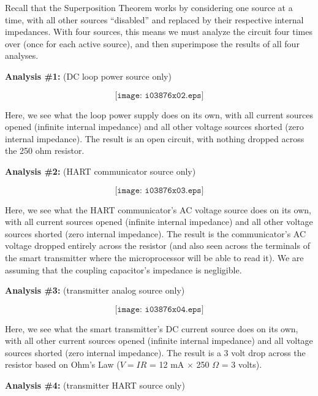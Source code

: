 
Recall that the Superposition Theorem works by considering one source at a time, with all other sources ``disabled'' and replaced by their respective internal impedances.  With four sources, this means we must analyze the circuit four times over (once for each active source), and then superimpose the results of all four analyses.







\noindent
{\bf Analysis \#1:} (DC loop power source only)

$$\texttt{[image: i03876x02.eps]}$$

Here, we see what the loop power supply does on its own, with all current sources opened (infinite internal impedance) and all other voltage sources shorted (zero internal impedance).  The result is an open circuit, with nothing dropped across the 250 ohm resistor.

\filbreak

\noindent
{\bf Analysis \#2:} (HART communicator source only)

$$\texttt{[image: i03876x03.eps]}$$

Here, we see what the HART communicator's AC voltage source does on its own, with all current sources opened (infinite internal impedance) and all other voltage sources shorted (zero internal impedance).  The result is the communicator's AC voltage dropped entirely across the resistor (and also seen across the terminals of the smart transmitter where the microprocessor will be able to read it).  We are assuming that the coupling capacitor's impedance is negligible.

\filbreak

\noindent
{\bf Analysis \#3:} (transmitter analog source only)

$$\texttt{[image: i03876x04.eps]}$$

Here, we see what the smart transmitter's DC current source does on its own, with all other current sources opened (infinite internal impedance) and all voltage sources shorted (zero internal impedance).  The result is a 3 volt drop across the resistor based on Ohm's Law ($V = IR$ = 12 mA $\times$ 250 $\Omega$ = 3 volts). 

\filbreak

\noindent
{\bf Analysis \#4:} (transmitter HART source only)

